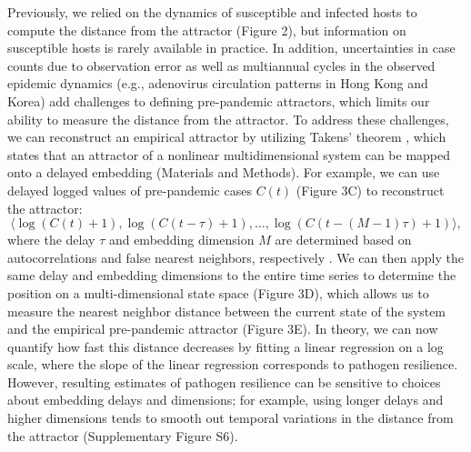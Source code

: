 \documentclass[12pt]{article}
\begin{document}
Previously, we relied on the dynamics of susceptible and infected hosts to compute the distance from the attractor (Figure 2), but information on susceptible hosts is rarely available in practice.
In addition, uncertainties in case counts due to observation error as well as multiannual cycles in the observed epidemic dynamics (e.g., adenovirus circulation patterns in Hong Kong and Korea) add challenges to defining pre-pandemic attractors, which limits our ability to measure the distance from the attractor.
To address these challenges, we can reconstruct an empirical attractor by utilizing Takens' theorem \citep{takens2006detecting}, which states that an attractor of a nonlinear multidimensional system can be mapped onto a delayed embedding (Materials and Methods).
For example, we can use delayed logged values of pre-pandemic cases $C(t)$ (Figure 3C) to reconstruct the attractor:
\begin{equation}
\langle\log(C(t)+1), \log(C(t-\tau)+1), \dots, \log(C(t-(M-1)\tau)+1)\rangle,
\end{equation}
where the delay $\tau$ and embedding dimension $M$ are determined based on autocorrelations and false nearest neighbors, respectively \citep{kennel1992determining,tan2023selecting}.
We can then apply the same delay and embedding dimensions to the entire time series to determine the position on a multi-dimensional state space (Figure 3D), which allows us to measure the nearest neighbor distance between the current state of the system and the empirical pre-pandemic attractor (Figure 3E).
In theory, we can now quantify how fast this distance decreases by fitting a linear regression on a log scale, where the slope of the linear regression corresponds to pathogen resilience.
However, resulting estimates of pathogen resilience can be sensitive to choices about embedding delays and dimensions; 
for example, using longer delays and higher dimensions tends to smooth out temporal variations in the distance from the attractor (Supplementary Figure S6).
\end{document}
